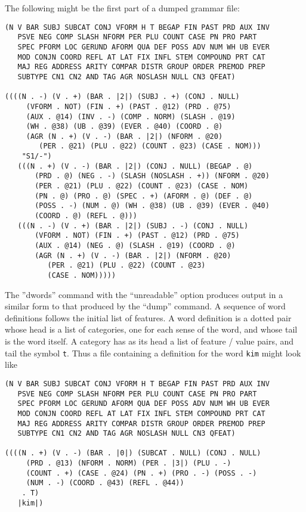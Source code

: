 The following might be the first part of a dumped grammar file:
{\small
\begin{ex}
\begin{verbatim}
(N V BAR SUBJ SUBCAT CONJ VFORM H T BEGAP FIN PAST PRD AUX INV
   PSVE NEG COMP SLASH NFORM PER PLU COUNT CASE PN PRO PART
   SPEC PFORM LOC GERUND AFORM QUA DEF POSS ADV NUM WH UB EVER
   MOD CONJN COORD REFL AT LAT FIX INFL STEM COMPOUND PRT CAT
   MAJ REG ADDRESS ARITY COMPAR DISTR GROUP ORDER PREMOD PREP
   SUBTYPE CN1 CN2 AND TAG AGR NOSLASH NULL CN3 QFEAT)

((((N . -) (V . +) (BAR . |2|) (SUBJ . +) (CONJ . NULL)
     (VFORM . NOT) (FIN . +) (PAST . @12) (PRD . @75)
     (AUX . @14) (INV . -) (COMP . NORM) (SLASH . @19)
     (WH . @38) (UB . @39) (EVER . @40) (COORD . @)
     (AGR (N . +) (V . -) (BAR . |2|) (NFORM . @20)
        (PER . @21) (PLU . @22) (COUNT . @23) (CASE . NOM)))
    "S1/-")
   (((N . +) (V . -) (BAR . |2|) (CONJ . NULL) (BEGAP . @)
       (PRD . @) (NEG . -) (SLASH (NOSLASH . +)) (NFORM . @20)
       (PER . @21) (PLU . @22) (COUNT . @23) (CASE . NOM)
       (PN . @) (PRO . @) (SPEC . +) (AFORM . @) (DEF . @)
       (POSS . -) (NUM . @) (WH . @38) (UB . @39) (EVER . @40)
       (COORD . @) (REFL . @)))
   (((N . -) (V . +) (BAR . |2|) (SUBJ . -) (CONJ . NULL)
       (VFORM . NOT) (FIN . +) (PAST . @12) (PRD . @75)
       (AUX . @14) (NEG . @) (SLASH . @19) (COORD . @) 
       (AGR (N . +) (V . -) (BAR . |2|) (NFORM . @20)
          (PER . @21) (PLU . @22) (COUNT . @23)
          (CASE . NOM)))))
\end{verbatim}
\end{ex}
}

The ''dwords'' command with the ``unreadable'' option produces output in a
similar form to that produced by the ``dump'' command. A sequence of word
definitions follows the initial list of features.
A word definition is a dotted pair whose head is a
list of categories, one for each sense of the word, and whose tail is
the word itself. A category has as its head a list of feature / value
pairs, and tail the symbol {\tt t}. Thus a file containing a
definition for the word {\tt kim} might look like
{\small
\begin{ex}
\begin{verbatim}
(N V BAR SUBJ SUBCAT CONJ VFORM H T BEGAP FIN PAST PRD AUX INV
   PSVE NEG COMP SLASH NFORM PER PLU COUNT CASE PN PRO PART
   SPEC PFORM LOC GERUND AFORM QUA DEF POSS ADV NUM WH UB EVER
   MOD CONJN COORD REFL AT LAT FIX INFL STEM COMPOUND PRT CAT
   MAJ REG ADDRESS ARITY COMPAR DISTR GROUP ORDER PREMOD PREP
   SUBTYPE CN1 CN2 AND TAG AGR NOSLASH NULL CN3 QFEAT)

((((N . +) (V . -) (BAR . |0|) (SUBCAT . NULL) (CONJ . NULL)
     (PRD . @13) (NFORM . NORM) (PER . |3|) (PLU . -)
     (COUNT . +) (CASE . @24) (PN . +) (PRO . -) (POSS . -)
     (NUM . -) (COORD . @43) (REFL . @44))
    . T)
   |kim|)
\end{verbatim}
\end{ex}
}


